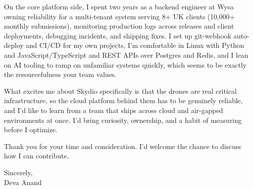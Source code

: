 \documentclass[letterpaper,11pt]{article}
\begin{document}
On the core platform side, I spent two years as a backend engineer at Wysa owning reliability for a multi-tenant system serving 8+ UK clients (10,000+ monthly submissions), monitoring production logs across releases and client deployments, debugging incidents, and shipping fixes. I set up git-webhook auto-deploy and CI/CD for my own projects, I'm comfortable in Linux with Python and JavaScript/TypeScript and REST APIs over Postgres and Redis, and I lean on AI tooling to ramp on unfamiliar systems quickly, which seems to be exactly the resourcefulness your team values.

What excites me about Skydio specifically is that the drones are real critical infrastructure, so the cloud platform behind them has to be genuinely reliable, and I'd like to learn from a team that ships across cloud and air-gapped environments at once. I'd bring curiosity, ownership, and a habit of measuring before I optimize.

\vspace{4pt}
Thank you for your time and consideration. I'd welcome the chance to discuss how I can contribute.

\vspace{8pt}
Sincerely, \\
Deva Anand
\end{document}
